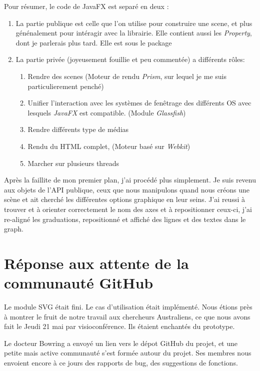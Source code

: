 Pour résumer, le code de JavaFX est separé en deux :
\begin{enumerate}
\item La partie publique est celle que l'on utilise pour construire une scene, et plus génénalement pour intéragir avec la librairie. Elle contient aussi les \textit{Property}, dont je parlerais plus tard. Elle est sous le package %
\item La partie privée (joyeusement fouillie et peu commentée) a différents rôles:%
  \begin{enumerate}	
  \item Rendre des scenes (Moteur de rendu \textit{Prism}, sur lequel je me suis particulierement penché)
  \item Unifier l'interaction avec les systèmes de fenêtrage des différents OS avec lesquels \textit{JavaFX} est compatible. (Module \textit{Glassfish})
  \item Rendre différents type de médias
  \item Rendu du HTML complet, (Moteur basé sur \textit{Webkit})
  \item Marcher sur plusieurs threads
  \end{enumerate}
\end{enumerate}

Après la faillite de mon premier plan, j'ai procédé plus simplement. Je suis revenu aux objets de l'API publique, ceux que nous manipulons quand nous créons une scène et ait cherché les différentes options graphique en leur seins. J'ai reussi à trouver et à orienter correctement le nom des axes et à repositionner ceux-ci, j'ai re-aligné les graduations, repositionné et affiché des lignes et des textes dans le graph.

%
%
%
\section{Réponse aux attente de la communauté GitHub}
Le module SVG était fini. Le cas d'utilisation était implémenté. Nous étions près à montrer le fruit de notre travail aux chercheurs Australiens, ce que nous avons fait le Jeudi%
21 mai par visioconférence. Ils étaient enchantés du prototype.

Le docteur Bowring a envoyé un lien vers le dépot GitHub du projet, et une petite mais active communauté s'est formée autour du projet. Ses membres nous envoient encore à ce jours des rapports de bug, des suggestions de fonctions.

